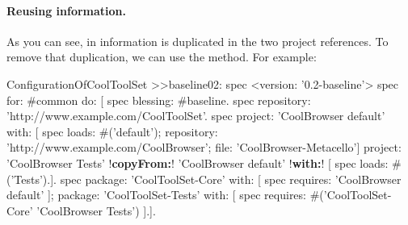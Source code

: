 \documentclass[a4paper,10pt,twoside]{book}
\begin{document}
%
%
%
%
%
%
%


\paragraph{Reusing information.}
As you can see, in  information is duplicated in the two project references. To remove that duplication, we can use the  method.  For example:

\begin{code}{}
ConfigurationOfCoolToolSet >>baseline02: spec
       <version: '0.2-baseline'>
       spec for: #common do: [
              spec blessing: #baseline.
              spec repository: 'http://www.example.com/CoolToolSet'.
              spec
                    project: 'CoolBrowser default' with: [
                            spec
                                   loads: #('default');
                                   repository: 'http://www.example.com/CoolBrowser';
                                   file: 'CoolBrowser-Metacello']
                    project: 'CoolBrowser Tests'
                            !\textbf{copyFrom:}! 'CoolBrowser default'
                            !\textbf{with:}! [ spec loads: #('Tests').].
              spec
                     package: 'CoolToolSet-Core' with: [ spec requires: 'CoolBrowser default' ];
                     package: 'CoolToolSet-Tests' with: [
                            spec requires: #('CoolToolSet-Core' 'CoolBrowser Tests') ].].
\end{code}
\end{document}
